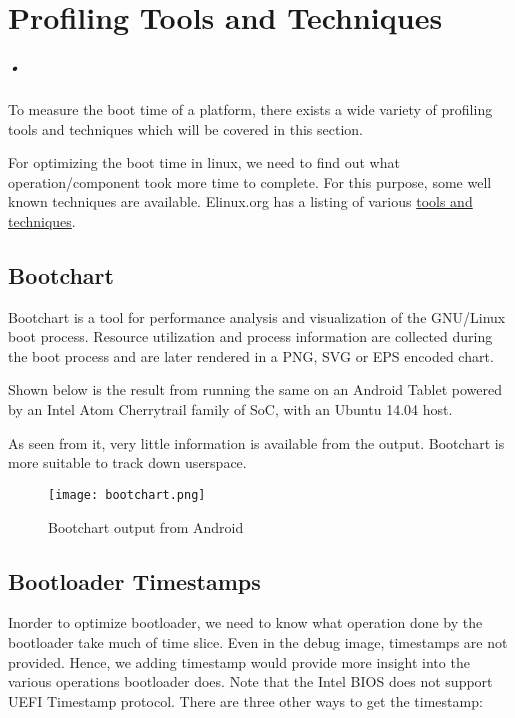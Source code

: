 

\chapter{Profiling Tools and Techniques}
\label{prof_tools_techniques}
\paragraph*{•}

\hspace{8mm} 

\noindent To measure the boot time of a platform, there exists a wide
variety of profiling tools and techniques which will be covered in
this section.

For optimizing the boot time in linux, we need to find out what operation/component took more
time to complete. For this purpose, some well known techniques are available. Elinux.org
has a listing of various \href{http://elinux.org/Boot_Time}{tools and techniques}.

\section{Bootchart}

Bootchart is a tool for performance analysis and visualization of the
GNU/Linux boot process. Resource utilization and process information are collected
during the boot process and are later rendered in a PNG, SVG or EPS encoded chart.

Shown below is the result from running the same on an Android Tablet
powered by an Intel Atom Cherrytrail family of SoC, with an Ubuntu 14.04 host.

As seen from it, very little information is available from the output.
Bootchart is more suitable to track down userspace.

\begin{figure}[h]
  \centering
    \texttt{[image: bootchart.png]}
    \caption{Bootchart output from Android}
    \label{fig:android_boot}
\end{figure}

\clearpage

\section{Bootloader Timestamps}

Inorder to optimize bootloader, we need to know what operation done by the
bootloader take much of time slice. Even in the debug image, timestamps
are not provided. Hence, we adding timestamp would provide more insight into
the various operations bootloader does. Note that the 
Intel BIOS does not support UEFI Timestamp protocol. There are three
other ways to get the timestamp:


